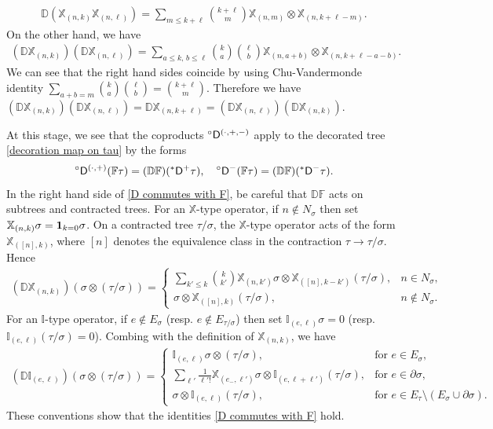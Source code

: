 \documentclass[10pt, reqno]{amsart}
\numberwithin{subsection}{section}
\numberwithin{subsubsection}{subsection}
\numberwithin{equation}{section} %
\theoremstyle{mystyle}
\theoremstyle{mystyle2}
\theoremstyle{mystyle3}
\newcommand{\bbF}{\mathbb{F}}
\newcommand{\bbD}{\mathbb{D}}
\newcommand{\ssk}{\smallskip}
\newcommand\bbI{\mathbb{I}}
\newcommand{\bbX}{\mathbb{X}}
\begin{document}
\begin{align*}
\bbD(\bbX_{(n,k)}\bbX_{(n,\ell)})=\sum_{m\le k+\ell}\binom{k+\ell}{m}\bbX_{(n,m)}\otimes\bbX_{(n,k+\ell-m)}.
\end{align*}
On the other hand, we have
\begin{align*}
(\bbD\bbX_{(n,k)})(\bbD\bbX_{(n,\ell)})=\sum_{a\le k,\,b\le\ell}\binom{k}{a}\binom{\ell}{b}\bbX_{(n,a+b)}\otimes\bbX_{(n,k+\ell-a-b)}.
\end{align*}
We can see that the right hand sides coincide by using Chu-Vandermonde identity $\sum_{a+b=m}\binom{k}{a}\binom{\ell}{b}=\binom{k+\ell}{m}$.
Therefore we have $(\bbD\bbX_{(n,k)})(\bbD\bbX_{(n,\ell)})=\bbD\bbX_{(n,k+\ell)}=(\bbD\bbX_{(n,\ell)})(\bbD\bbX_{(n,k)})$.

\ssk

At this stage, we see that the coproducts ${^\circ}{\sf D}^{(\cdot,+,-)}$ 
apply to the decorated tree \eqref{decoration map on tau} by the forms
\begin{align}\label{D commutes with F}
{^\circ}{\sf D}^{(\cdot,+)}(\bbF\tau)=(\bbD\bbF)({^*}{\sf D}^+\tau),\quad
{^\circ}{\sf D}^{-}(\bbF\tau)=(\bbD\bbF)({^*}{\sf D}^{-}\tau).
\end{align}
In the right hand side of \eqref{D commutes with F}, be careful that $\bbD\bbF$ acts on subtrees and contracted trees. 
For an $\bbX$-type operator, if $n\notin N_\sigma$ then set $\bbX_{(n,k)}\sigma={\bf1}_{k=0}\sigma$. On a contracted tree $\tau/\sigma$, the $\bbX$-type operator acts of the form $\bbX_{([n],k)}$, where $[n]$ denotes the equivalence class in the contraction $\tau\to\tau/\sigma$. Hence
\begin{align*}
(\bbD\bbX_{(n,k)})(\sigma\otimes(\tau/\sigma))
=
\begin{cases}
\sum_{k'\le k}\binom{k}{k'}\bbX_{(n,k')}\sigma\otimes\bbX_{([n],k-k')}(\tau/\sigma),&n\in N_\sigma,\\
\sigma\otimes\bbX_{([n],k)}(\tau/\sigma),&n\notin N_\sigma.
\end{cases}
\end{align*}
For an $\bbI$-type operator, if $e\notin E_\sigma$ (resp. $e\notin E_{\tau/\sigma}$) then set $\bbI_{(e,\ell)}\sigma=0$ (resp. $\bbI_{(e,\ell)}(\tau/\sigma)=0$). Combing with the definition of $\bbX_{(n,k)}$, we have
\begin{align*}
(\bbD\bbI_{(e,\ell)})(\sigma\otimes(\tau/\sigma))
=
\begin{cases}
\bbI_{(e,\ell)}\sigma\otimes(\tau/\sigma), &\textrm{for } e\in E_\sigma,\\
\sum_{\ell'}\frac1{\ell'!}\bbX_{(e_-,\ell')}\sigma\otimes\bbI_{(e,\ell+\ell')}(\tau/\sigma), &\textrm{for } e\in\partial\sigma,\\
\sigma\otimes\bbI_{(e,\ell)}(\tau/\sigma), &\textrm{for } e\in E_\tau\setminus(E_\sigma\cup\partial\sigma).
\end{cases}
\end{align*}
These conventions show that the identities \eqref{D commutes with F} hold.
\end{document}
